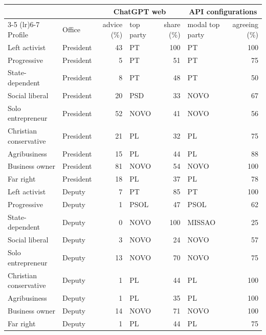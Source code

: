 \begin{tabular}{llrlrlr}
\toprule
 & & \multicolumn{3}{c}{ChatGPT web} & \multicolumn{2}{c}{API configurations} \\
\cmidrule(lr){3-5} \cmidrule(lr){6-7}
Profile & Office & advice (\%) & top party & share (\%) & modal top party & agreeing (\%) \\
\midrule
Left activist & President & 43 & PT & 100 & PT & 100 \\
Progressive & President & 5 & PT & 51 & PT & 75 \\
State-dependent & President & 8 & PT & 48 & PT & 50 \\
Social liberal & President & 20 & PSD & 33 & NOVO & 67 \\
Solo entrepreneur & President & 52 & NOVO & 41 & NOVO & 56 \\
Christian conservative & President & 21 & PL & 32 & PL & 75 \\
Agribusiness & President & 15 & PL & 44 & PL & 88 \\
Business owner & President & 81 & NOVO & 54 & NOVO & 100 \\
Far right & President & 18 & PL & 37 & PL & 78 \\
Left activist & Deputy & 7 & PT & 85 & PT & 100 \\
Progressive & Deputy & 1 & PSOL & 47 & PSOL & 62 \\
State-dependent & Deputy & 0 & NOVO & 100 & MISSAO & 25 \\
Social liberal & Deputy & 3 & NOVO & 24 & NOVO & 57 \\
Solo entrepreneur & Deputy & 13 & NOVO & 70 & NOVO & 75 \\
Christian conservative & Deputy & 1 & PL & 44 & PL & 100 \\
Agribusiness & Deputy & 1 & PL & 35 & PL & 100 \\
Business owner & Deputy & 14 & NOVO & 71 & NOVO & 100 \\
Far right & Deputy & 1 & PL & 44 & PL & 75 \\
\bottomrule
\end{tabular}
